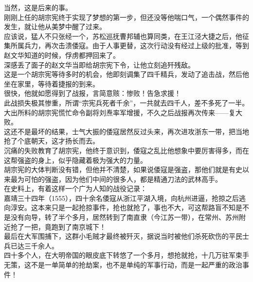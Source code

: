 \begin{multicols}{\theparacolNo}
当然，这是后来的事。\\

刚刚上任的胡宗宪终于实现了梦想的第一步，但还没等他喘口气，一个偶然事件的发生，就让他从美梦中醒了过来。\\

应该说，猛人不只张经一个，苏松巡抚曹邦辅也算同类，在王江泾大捷之后，他征集所属兵力，再次击溃倭寇。由于人事更替，这次行动没有经过上级的批准，等到赵文华知道的时候，俘虏都押回来了。\\

深感丢了面子的赵文华当即给胡宗宪下令，让他立刻追歼残敌。\\

这是一个胡宗宪等待多时的机会，他即刻调集了四千精兵，发动了追击战，然后他坐在家里，等待着捷报的到来。\\

很快，他就如愿得到了战报，言简意赅：惨败！告急求援！\\

此战损失极其惨重，所谓“宗宪兵死者千余”，一共就去四千人，差不多死了一半。大出所料的胡宗宪慌忙命令副将刘焘率军增援，不久之后战报再次传来——复大败。\\

这还不是最坏的结果，士气大振的倭寇居然反过头来，再次进攻浙东一带，把当地抢了个底朝天，这才扬长而去。\\

沉痛的失败教育了胡宗宪，他终于意识到，倭寇之乱比他想象中要厉害得多，而在这帮强盗的身上，似乎隐藏着极为强大的力量。\\

胡宗宪的大体判断没有错，但他并不清楚，如果说倭寇是强盗，那他们就是有史以来最为可怕的强盗，因为他们中间的很多人，都是精通刀法的武林高手。\\

在史料上，有着这样一个广为人知的战役记录：\\

嘉靖三十四年（1555），四十余名倭寇从浙江平湖入境，向杭州进逼，抢掠之后逃向淳安。这本来只是一起抢掠事件，抢也就抢了，事也不大，可这帮路盲不知是不是没有向导，转了半个多月，居然转到了南直隶（今江苏一带），在常州、苏州附近抢了一把，竟跑到了南京城下！\\

最后在大军围捕下，这群小毛贼才最终被歼灭，据说当时被他们杀死砍伤的平民士兵已达三千余人。\\

四十多个人，在大明帝国的眼皮底下转悠了一个多月，想抢就抢，十几万驻军束手无策，这不是一单简单的抢劫案，也不是单纯的军事行动，而是一起严重的政治事件！\\


\end{multicols}
